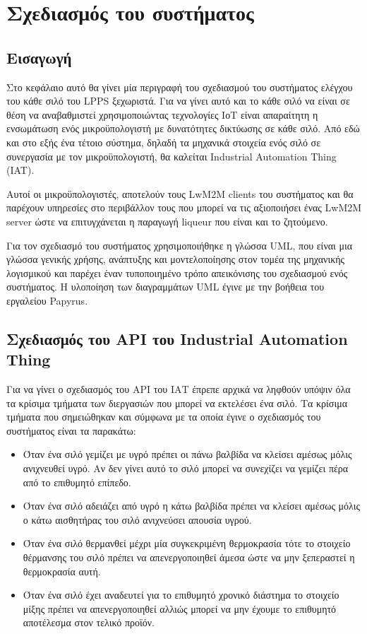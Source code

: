 \chapter{Σχεδιασμός του συστήματος} %

\label{Chapter6} 

\section{Εισαγωγή}
Στο κεφάλαιο αυτό θα γίνει μία περιγραφή του σχεδιασμού του συστήματος ελέγχου του κάθε σιλό του LPPS ξεχωριστά. Για να γίνει αυτό και το κάθε σιλό να είναι σε θέση να αναβαθμιστεί χρησιμοποιώντας τεχνολογίες ΙοΤ είναι απαραίτητη η ενσωμάτωση ενός μικροϋπολογιστή με δυνατότητες δικτύωσης σε κάθε σιλό. Από εδώ και στο εξής ένα τέτοιο σύστημα, δηλαδή τα μηχανικά στοιχεία ενός σιλό σε συνεργασία με τον μικροϋπολογιστή, θα καλείται Industrial Automation Thing (IAT). 

	Αυτοί οι μικροϋπολογιστές, αποτελούν τους LwM2M clients του συστήματος και θα παρέχουν υπηρεσίες στο περιβάλλον τους που μπορεί να τις αξιοποιήσει ένας LwM2M server ώστε να επιτυγχάνεται η παραγωγή liqueur που είναι και το ζητούμενο. 
	
Για τον σχεδιασμό του συστήματος χρησιμοποιήθηκε η γλώσσα UML, που είναι μια γλώσσα γενικής χρήσης, ανάπτυξης και μοντελοποίησης στον τομέα της μηχανικής λογισμικού και παρέχει έναν τυποποιημένο τρόπο απεικόνισης του σχεδιασμού ενός συστήματος. Η υλοποίηση των διαγραμμάτων UML έγινε με την βοήθεια του εργαλείου Papyrus. 
	
\section{Σχεδιασμός του API του Industrial Automation Thing}

Για να γίνει ο σχεδιασμός του API του ΙΑΤ έπρεπε αρχικά να ληφθούν υπόψιν όλα τα κρίσιμα τμήματα των διεργασιών που μπορεί να εκτελέσει ένα σιλό. Τα κρίσιμα τμήματα που σημειώθηκαν και σύμφωνα με τα οποία έγινε ο σχεδιασμός του συστήματος είναι τα παρακάτω: 

\begin{itemize}
	\item{Όταν ένα σιλό γεμίζει με υγρό πρέπει οι πάνω βαλβίδα να κλείσει αμέσως μόλις ανιχνευθεί υγρό. Αν δεν γίνει αυτό το σιλό μπορεί να συνεχίζει να γεμίζει πέρα από το επιθυμητό επίπεδο. }
	\item{Όταν ένα σιλό αδειάζει από υγρό η κάτω βαλβίδα πρέπει να κλείσει αμέσως μόλις ο κάτω αισθητήρας του σιλό ανιχνεύσει απουσία υγρού. }
	\item{Όταν ένα σιλό θερμανθεί μέχρι μία συγκεκριμένη θερμοκρασία τότε το στοιχείο θέρμανσης του σιλό πρέπει να απενεργοποιηθεί άμεσα ώστε να μην ξεπεραστεί η θερμοκρασία αυτή.}
	\item{Όταν ένα σιλό έχει αναδευτεί για το επιθυμητό χρονικό διάστημα το στοιχείο μίξης πρέπει να απενεργοποιηθεί αλλιώς μπορεί να μην έχουμε το επιθυμητό αποτέλεσμα στον τελικό προϊόν.}
\end{itemize}


